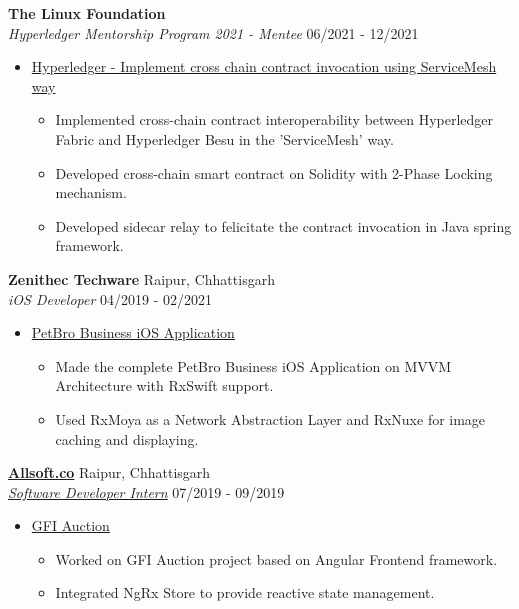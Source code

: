 \documentclass{article}
\begin{document}
\noindent \normalsize \textbf{The Linux Foundation} \\
\textit{Hyperledger Mentorship Program 2021 - Mentee} \hfill 06/2021 - 12/2021
\begin{itemize}[noitemsep,nolistsep,leftmargin=*]
    \item {\normalsize \href{https://wiki.hyperledger.org/display/INTERN/Implement+cross+chain+contract+invocation+using+ServiceMesh+way}{Hyperledger - Implement cross chain contract invocation using ServiceMesh way}
        \begin{itemize}
            \item Implemented cross-chain contract interoperability between Hyperledger Fabric and Hyperledger Besu in the 'ServiceMesh' way.
            \item Developed cross-chain smart contract on Solidity with 2-Phase Locking mechanism.
            \item Developed sidecar relay to felicitate the contract invocation in Java spring framework.
        \end{itemize}
    }
\end{itemize}

\noindent \normalsize \textbf{Zenithec Techware} \hfill Raipur, Chhattisgarh \\
\textit{iOS Developer} \hfill 04/2019 - 02/2021
\begin{itemize}[noitemsep,nolistsep,leftmargin=*]
    \item {\normalsize \href{https://apple.co/3kAiLJ0}{PetBro Business iOS Application}
        \begin{itemize}
            \item Made the complete PetBro Business iOS Application on MVVM Architecture with RxSwift support.
            \item Used RxMoya as a Network Abstraction Layer and RxNuxe for image caching and displaying.
        \end{itemize}
    }
\end{itemize}

\noindent \normalsize \href{https://bit.ly/allsoft_certificate}{\textbf{Allsoft.co}} \hfill Raipur, Chhattisgarh \\
\noindent \normalsize \textit{\href{https://bit.ly/allsoft_certificate}{Software Developer Intern}} \hfill 07/2019 - 09/2019
\begin{itemize}[noitemsep,nolistsep,leftmargin=*]
    \item {\normalsize \href{https://bit.ly/allsoft_certificate}{GFI Auction}
        \begin{itemize}
            \item Worked on GFI Auction project based on Angular Frontend framework.
            \item Integrated NgRx Store to provide reactive state management.
        \end{itemize}
    }
\end{itemize}
\end{document}
